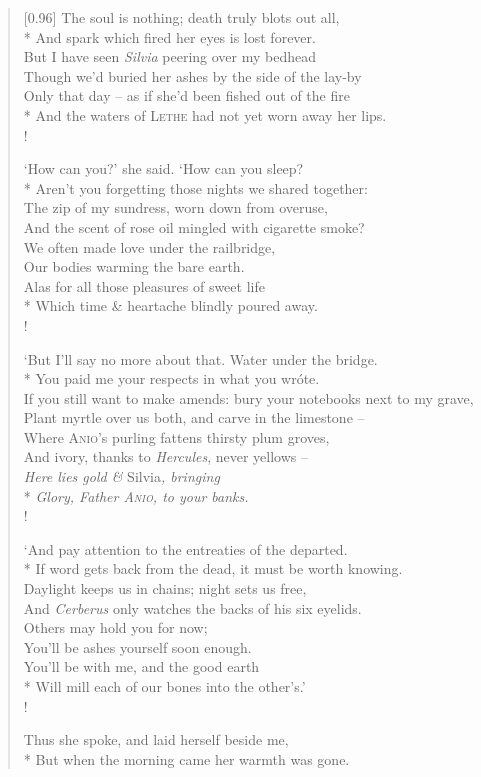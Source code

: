 \begin{verse}[0.96\textwidth]
    The soul is nothing; death truly blots out all,\\*
    \vin And spark which fired her eyes is lost forever.\\
    But I have seen \textit{Silvia} peering over my bedhead\\
    \vin Though we'd buried her ashes by the side of the lay-by\\
    Only that day -- as if she'd been fished out of the fire\\*
    \vin And the waters of \textsc{Lethe} had not yet worn away her lips.\\!

    `How can you?' she said. `How can you sleep?\\*
    \vin Aren't you forgetting those nights we shared together:\nobreak\\
    The zip of my sundress, worn down from overuse,\\
    \vin And the scent of rose oil mingled with cigarette smoke?\\
    We often made love under the railbridge,\\
    \vin Our bodies warming the bare earth.\\
    Alas for all those pleasures of sweet life\\*
    \vin Which time \& heartache blindly poured away.\\!

    `But I'll say no more about that. Water under the bridge.\nobreak\\*
    \vin You paid me your respects in what you wr\'ote.\\
    If you still want to make amends: bury your notebooks next to my grave,\\
    \vin Plant myrtle over us both, and carve in the limestone --\\
    Where \textsc{Anio}'s purling fattens thirsty plum groves,\\
    \vin And ivory, thanks to \textit{Hercules}, never yellows --\\
    \textit{Here lies gold \& }Silvia\textit{, bringing}\\*
    \vin \textit{Glory, Father \textsc{Anio}, to your banks.}\\!

    `And pay attention to the entreaties of the departed.\\*
    \vin If word gets back from the dead, it must be worth knowing.\\
    Daylight keeps us in chains; night sets us free,\\
    \vin And \textit{Cerberus} only watches the backs of his six eyelids.\nobreak\\
    Others may hold you for now;\\
    \vin You'll be ashes yourself soon enough.\\
    You'll be with me, and the good earth\\*
    \vin Will mill each of our bones into the other's.'\\!

    Thus she spoke, and laid herself beside me,\\*
    \vin But when the morning came her warmth was gone.
\end{verse}
